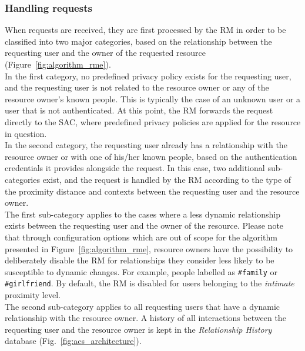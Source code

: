 \subsubsection{Handling requests}
When requests are received, they are first processed by the RM in order to be classified into two major categories, based on the relationship between the requesting user and the owner of the requested resource (Figure~\ref{fig:algorithm_rme}).\\

In the first category, no predefined privacy policy exists for the requesting user, and the requesting user is not related to the resource owner or any of the resource owner's known people. This is typically the case of an unknown user or a user that is not authenticated. At this point, the RM forwards the request directly to the SAC, where predefined privacy policies are applied for the resource in question.\\

In the second category, the requesting user already has a relationship with the resource owner or with one of his/her known people, based on the authentication credentials it provides alongside the request. In this case, two additional sub-categories exist, and the request is handled by the RM according to the type of the proximity distance and contexts between the requesting user and the resource owner.\\

The first sub-category applies to the cases where a less dynamic relationship exists between the requesting user and the owner of the resource. Please note that through configuration options which are out of scope for the algorithm presented in Figure~\ref{fig:algorithm_rme}, resource owners have the possibility to deliberately disable the RM for relationships they consider less likely to be susceptible to dynamic changes. For example, people labelled as \verb+#family+ or \verb+#girlfriend+. By default, the RM is disabled for users belonging to the \textit{intimate} proximity level.\\

The second sub-category applies to all requesting users that have a dynamic relationship with the resource owner. A history of all interactions between the requesting user and the resource owner is kept in the \textit{Relationship History} database (Fig.~\ref{fig:acs_architecture}).\\

